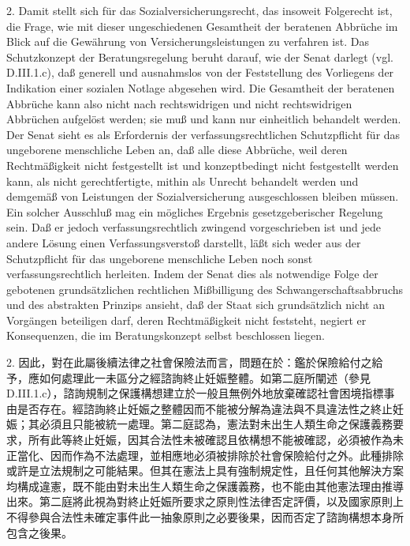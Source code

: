 \documentclass[12pt]{article}
\begin{document}
\begin{sourcepara}[title={原文SondervotumB.319}]
2. Damit stellt sich für das Sozialversicherungsrecht, das insoweit Folgerecht ist, die Frage, wie mit dieser ungeschiedenen Gesamtheit der beratenen Abbrüche im Blick auf die Gewährung von Versicherungsleistungen zu verfahren ist. Das Schutzkonzept der Beratungsregelung beruht darauf, wie der Senat darlegt (vgl. D.III.1.c), daß generell und ausnahmslos von der Feststellung des Vorliegens der Indikation einer sozialen Notlage abgesehen wird. Die Gesamtheit der beratenen Abbrüche kann also nicht nach rechtswidrigen und nicht rechtswidrigen Abbrüchen aufgelöst werden; sie muß und kann nur einheitlich behandelt werden. Der Senat sieht es als Erfordernis der verfassungsrechtlichen Schutzpflicht für das ungeborene menschliche Leben an, daß alle diese Abbrüche, weil deren Rechtmäßigkeit nicht festgestellt ist und konzeptbedingt nicht festgestellt werden kann, als nicht gerechtfertigte, mithin als Unrecht behandelt werden und demgemäß von Leistungen der Sozialversicherung ausgeschlossen bleiben müssen. Ein solcher Ausschluß mag ein mögliches Ergebnis gesetzgeberischer Regelung sein. Daß er jedoch verfassungsrechtlich zwingend vorgeschrieben ist und jede andere Lösung einen Verfassungsverstoß darstellt, läßt sich weder aus der Schutzpflicht für das ungeborene menschliche Leben noch sonst verfassungsrechtlich herleiten. Indem der Senat dies als notwendige Folge der gebotenen grundsätzlichen rechtlichen Mißbilligung des Schwangerschaftsabbruchs und des abstrakten Prinzips ansieht, daß der Staat sich grundsätzlich nicht an Vorgängen beteiligen darf, deren Rechtmäßigkeit nicht feststeht, negiert er Konsequenzen, die im Beratungskonzept selbst beschlossen liegen.
\end{sourcepara}
\begin{transpara}
2. 因此，對在此屬後續法律之社會保險法而言，問題在於：鑑於保險給付之給予，應如何處理此一未區分之經諮詢終止妊娠整體。如第二庭所闡述（參見 D.III.1.c），諮詢規制之保護構想建立於一般且無例外地放棄確認社會困境指標事由是否存在。經諮詢終止妊娠之整體因而不能被分解為違法與不具違法性之終止妊娠；其必須且只能被統一處理。第二庭認為，憲法對未出生人類生命之保護義務要求，所有此等終止妊娠，因其合法性未被確認且依構想不能被確認，必須被作為未正當化、因而作為不法處理，並相應地必須被排除於社會保險給付之外。此種排除或許是立法規制之可能結果。但其在憲法上具有強制規定性，且任何其他解決方案均構成違憲，既不能由對未出生人類生命之保護義務，也不能由其他憲法理由推導出來。第二庭將此視為對終止妊娠所要求之原則性法律否定評價，以及國家原則上不得參與合法性未確定事件此一抽象原則之必要後果，因而否定了諮詢構想本身所包含之後果。
\end{transpara}
\end{document}
